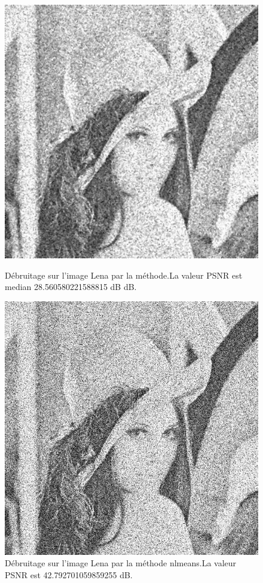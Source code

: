 \documentclass[12pt,a4paper]{report}
\numberwithin{equation}{subsection}
\numberwithin{equation}{section}
\begin{document}
\begin{figure}
  \begin{minipage}[t]{0.45\textwidth} %
    \includegraphics[width=\linewidth]{3x3median_gauss_alpha.jpg}
    \caption{Débruitage sur l’image Lena par la méthode.\newline \newline La valeur PSNR est median 28.560580221588815 dB dB.}
  \end{minipage}%
  \hfill
  \begin{minipage}[t]{0.45\textwidth}
    \includegraphics[width=\linewidth]{nlmeans1_gauus_alpha.jpg}
    \caption{Débruitage sur l’image Lena par la méthode nlmeans.\newline \newline La valeur PSNR est 42.792701059859255 dB.}
  \end{minipage}
\end{figure}
\end{document}
